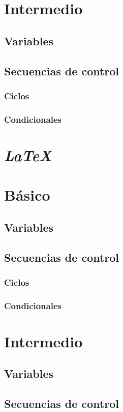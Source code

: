\documentclass{IEEEtran}
\begin{document}
			\section{Intermedio}
				\subsection{Variables}	\lipsum[1-10]
				\subsection{Secuencias de control}	
					\subsubsection{Ciclos}	
					\subsubsection{Condicionales}	\lipsum[1-10]
		\section{\textit{LaTeX}}	\lipsum[1-10]
\section{Básico}	\lipsum[1-10]
\subsection{Variables}	\lipsum[1-10]
\subsection{Secuencias de control}	
\subsubsection{Ciclos}	\lipsum[1-10]
\subsubsection{Condicionales}
\section{Intermedio}	
\subsection{Variables}	\lipsum[1-10]
\subsection{Secuencias de control}	\lipsum[1-10]
\end{document}
